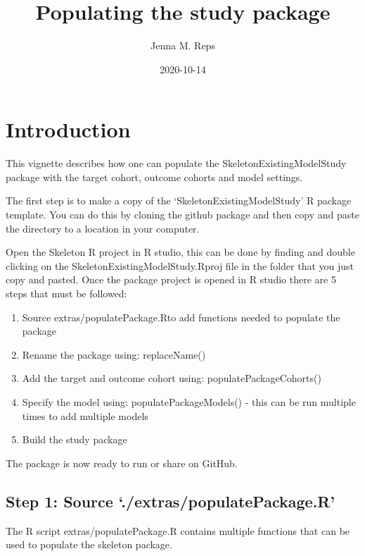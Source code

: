 \documentclass[
]{article}
\title{Populating the study package}
\author{Jenna M. Reps}
\date{2020-10-14}
\providecommand{\tightlist}{%
  \setlength{\itemsep}{0pt}\setlength{\parskip}{0pt}}
\begin{document}
\maketitle

{
\setcounter{tocdepth}{2}
\tableofcontents
}
\hypertarget{introduction}{%
\section{Introduction}\label{introduction}}

This vignette describes how one can populate the
SkeletonExistingModelStudy package with the target cohort, outcome
cohorts and model settings.

The first step is to make a copy of the `SkeletonExistingModelStudy' R
package template. You can do this by cloning the github package and then
copy and paste the directory to a location in your computer.

Open the Skeleton R project in R studio, this can be done by finding and
double clicking on the SkeletonExistingModelStudy.Rproj file in the
folder that you just copy and pasted. Once the package project is opened
in R studio there are 5 steps that must be followed:

\begin{enumerate}
\def\labelenumi{\arabic{enumi}.}
\tightlist
\item
  Source extras/populatePackage.Rto add functions needed to populate the
  package
\item
  Rename the package using: replaceName()
\item
  Add the target and outcome cohort using: populatePackageCohorts()
\item
  Specify the model using: populatePackageModels() - this can be run
  multiple times to add multiple models
\item
  Build the study package
\end{enumerate}

The package is now ready to run or share on GitHub.

\hypertarget{step-1-source-.extraspopulatepackage.r}{%
\subsection{Step 1: Source
`./extras/populatePackage.R'}\label{step-1-source-.extraspopulatepackage.r}}

The R script extras/populatePackage.R contains multiple functions that
can be used to populate the skeleton package.
\end{document}
